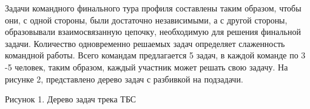 Задачи командного финального тура профиля составлены таким образом, чтобы они, с одной стороны, были достаточно независимыми, а с другой стороны, образовывали взаимосвязанную цепочку, необходимую для решения финальной задачи. Количество одновременно решаемых задач определяет слаженность командной работы. Всего командам предлагается 5 задач, в каждой команде по 3 -5 человек, таким образом, каждый участник может решать свою задачу. На рисунке 2, представлено дерево задач с разбивкой на подзадачи.


\begin{center}
    Рисунок 1. Дерево задач трека ТБС
\end{center}